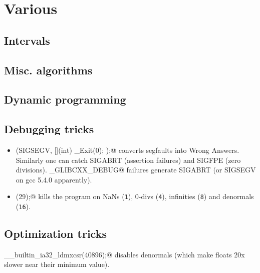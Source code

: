 \chapter{Various}


\section{Intervals}

\section{Misc. algorithms}

\section{Dynamic programming}

\section{Debugging tricks}
	\begin{itemize}
		\item \verb@signal(SIGSEGV, [](int) { _Exit(0); });@ converts segfaults into Wrong Answers.
			Similarly one can catch SIGABRT (assertion failures) and SIGFPE (zero divisions).
			\verb@_GLIBCXX_DEBUG@ failures generate SIGABRT (or SIGSEGV on gcc 5.4.0 apparently).
		\item \verb@feenableexcept(29);@ kills the program on NaNs (\texttt 1), 0-divs (\texttt 4), infinities (\texttt 8) and denormals (\texttt{16}).
	\end{itemize}

\section{Optimization tricks}
	\verb@__builtin_ia32_ldmxcsr(40896);@ disables denormals (which make floats 20x slower near their minimum value).

